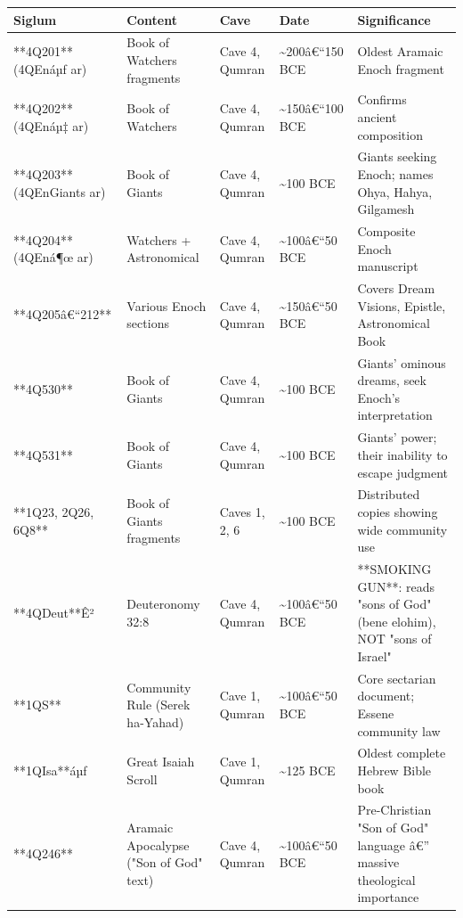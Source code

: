 \documentclass[aps,prd,11pt,onecolumn,superscriptaddress,nofootinbib,floatfix]{revtex4-2}
\begin{document}
\begin{table}[h!]
\centering
\begin{tabular}{p{3cm}p{3cm}p{3cm}p{3cm}p{3cm}}
\hline
Siglum & Content & Cave & Date & Significance \\
\hline
**4Q201** (4QEnáµƒ ar) & Book of Watchers fragments & Cave 4, Qumran & \textasciitilde{}200â€``150 BCE & Oldest Aramaic Enoch fragment \\
**4Q202** (4QEnáµ‡ ar) & Book of Watchers & Cave 4, Qumran & \textasciitilde{}150â€``100 BCE & Confirms ancient composition \\
**4Q203** (4QEnGiants ar) & Book of Giants & Cave 4, Qumran & \textasciitilde{}100 BCE & Giants seeking Enoch; names Ohya, Hahya, Gilgamesh \\
**4Q204** (4QEná¶œ ar) & Watchers + Astronomical & Cave 4, Qumran & \textasciitilde{}100â€``50 BCE & Composite Enoch manuscript \\
**4Q205â€``212** & Various Enoch sections & Cave 4, Qumran & \textasciitilde{}150â€``50 BCE & Covers Dream Visions, Epistle, Astronomical Book \\
**4Q530** & Book of Giants & Cave 4, Qumran & \textasciitilde{}100 BCE & Giants' ominous dreams, seek Enoch's interpretation \\
**4Q531** & Book of Giants & Cave 4, Qumran & \textasciitilde{}100 BCE & Giants' power; their inability to escape judgment \\
**1Q23, 2Q26, 6Q8** & Book of Giants fragments & Caves 1, 2, 6 & \textasciitilde{}100 BCE & Distributed copies showing wide community use \\
**4QDeut**Ê² & Deuteronomy 32:8 & Cave 4, Qumran & \textasciitilde{}100â€``50 BCE & **SMOKING GUN**: reads "sons of God" (bene elohim), NOT "sons of Israel" \\
**1QS** & Community Rule (Serek ha-Yahad) & Cave 1, Qumran & \textasciitilde{}100â€``50 BCE & Core sectarian document; Essene community law \\
**1QIsa**áµƒ & Great Isaiah Scroll & Cave 1, Qumran & \textasciitilde{}125 BCE & Oldest complete Hebrew Bible book \\
**4Q246** & Aramaic Apocalypse ("Son of God" text) & Cave 4, Qumran & \textasciitilde{}100â€``50 BCE & Pre-Christian "Son of God" language â€'' massive theological importance \\
\hline
\end{tabular}
\end{table}
\end{document}
